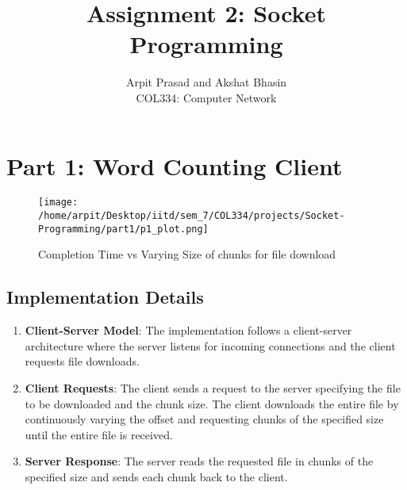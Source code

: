 \documentclass[12pt]{article}
\begin{document}
 
 
\title{Assignment 2: Socket Programming}
\author{Arpit Prasad and Akshat Bhasin\\ 
COL334: Computer Network}

\maketitle
\section{Part 1: Word Counting Client}

\begin{figure}[h!]
    \centering
    \texttt{[image: /home/arpit/Desktop/iitd/sem\_7/COL334/projects/Socket-Programming/part1/p1\_plot.png]}
    \caption{Completion Time vs Varying Size of chunks for file download}
    \label{fig:part1_output}
\end{figure}

\subsection{Implementation Details}
\begin{enumerate}
    \item \textbf{Client-Server Model}: The implementation follows a client-server architecture where the server listens for incoming connections and the client requests file downloads.
    \item \textbf{Client Requests}: The client sends a request to the server specifying the file to be downloaded and the chunk size. The client downloads the entire file by continuously varying the offset and requesting chunks of the specified size until the entire file is received.
    \item \textbf{Server Response}: The server reads the requested file in chunks of the specified size and sends each chunk back to the client.
\end{enumerate}
\end{document}
